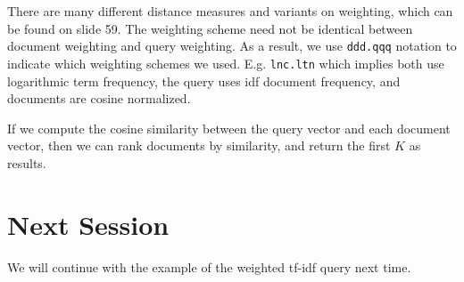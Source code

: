 \documentclass{idc_msc}
\begin{document}
There are many different distance measures and variants on weighting, which can be found on slide 59.
The weighting scheme need not be identical between document weighting and query weighting.
As a result, we use \texttt{ddd.qqq} notation to indicate which weighting schemes we used.
E.g. \texttt{lnc.ltn} which implies both use logarithmic term frequency, the query uses idf document frequency, and documents are cosine normalized.

If we compute the cosine similarity between the query vector and each document vector, then we can rank documents by similarity, and return the first \(K\) as results.

\section{Next Session}

We will continue with the example of the weighted tf-idf query next time.
\end{document}
